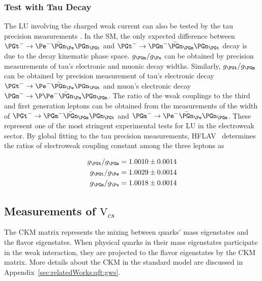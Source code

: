 \subsubsection{Test with Tau Decay}


The LU involving the charged weak current can also be tested by the tau precision measurements \cite{Pich:2013lsa,Amhis:2019ckw}. In the SM, the only expected difference between $\PGt^- \to \Pe^- \bar{\PGn}_\Pe \PGn_\PGt$ and $\PGt^- \to \PGm^- \bar{\PGn}_\PGm \PGn_\PGt$  decay is due to the decay kinematic phase space. $g_\PGm  / g_\Pe $ can be obtained by precision measurements of tau's electronic and muonic decay widths. Similarly,  $g_\PGt  / g_\PGm $ can be obtained by precision measurement of tau's electronic decay $\PGt^- \to \Pe^- \bar{\PGn}_\Pe \PGn_\PGt$ and muon's electronic decay $\PGm^- \to \P\Pe^- \bar{\PGn}_\Pe \PGn_\PGm$.  The ratio of the weak couplings to the third and first generation leptons can be obtained from the measurements of the width of $\PGt^- \to \PGm^- \bar{\PGn}_\PGm \PGn_\PGt$  and $\PGm^- \to \Pe^- \bar{\PGn}_\Pe \PGn_\PGm$.  These represent one of the most stringent experimental tests for LU in the electroweak sector. By global fitting to the tau precision measurements, HFLAV~\cite{Amhis:2019ckw} determines the ratios of electroweak coupling constant among the three leptons as 

\begin{align*}
    g_\PGt / g_\PGm &= 1.0010 \pm 0.0014 \\
    g_\PGt / g_\Pe   &= 1.0029 \pm 0.0014 \\
    g_\PGm  / g_\Pe   &= 1.0018 \pm 0.0014 
\end{align*}



\subsection{Measurements of $\mathrm{V}_{cs}$ }
\label{sec:Introduction:relatedWorks:vcsMeasurements}

The CKM matrix represents the mixing between quarks' mass eigenstates and the flavor eigenstates. When physical quarks in their mass eigenstates participate in the weak interaction, they are projected to the flavor eigenstates by the CKM matrix. More details about the CKM in the standard model are discussed in Appendix~\ref{sec:relatedWorks:qft:gws}. 

